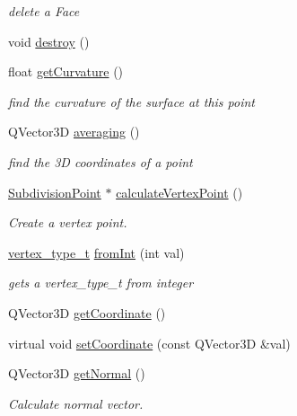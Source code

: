 \begin{DoxyCompactItemize}
\begin{DoxyCompactList}\small\item\em delete a Face \end{DoxyCompactList}\item 
void \hyperlink{classShipCAD_1_1SubdivisionPoint_a6037d6e3e78c9cc0d7909a4e55737ad6}{destroy} ()
\item 
float \hyperlink{classShipCAD_1_1SubdivisionPoint_aa07a859d70f97e57fc5318fc64a9d897}{get\-Curvature} ()
\begin{DoxyCompactList}\small\item\em find the curvature of the surface at this point \end{DoxyCompactList}\item 
Q\-Vector3\-D \hyperlink{classShipCAD_1_1SubdivisionPoint_a0c9e47af796dacd9542d065bbd0d0fcf}{averaging} ()
\begin{DoxyCompactList}\small\item\em find the 3\-D coordinates of a point \end{DoxyCompactList}\item 
\hyperlink{classShipCAD_1_1SubdivisionPoint}{Subdivision\-Point} $\ast$ \hyperlink{classShipCAD_1_1SubdivisionPoint_a92632ddbe28fb6901e445b60eab8d3ee}{calculate\-Vertex\-Point} ()
\begin{DoxyCompactList}\small\item\em Create a vertex point. \end{DoxyCompactList}\item 
\hyperlink{namespaceShipCAD_a03171cc921c53a568b778f5131a60deb}{vertex\-\_\-type\-\_\-t} \hyperlink{classShipCAD_1_1SubdivisionPoint_ad6ef4b07ee0d97756395c7bac4082f42}{from\-Int} (int val)
\begin{DoxyCompactList}\small\item\em gets a vertex\-\_\-type\-\_\-t from integer \end{DoxyCompactList}\item 
Q\-Vector3\-D \hyperlink{classShipCAD_1_1SubdivisionPoint_a0cf49d3e181eb00c08119721b33275bc}{get\-Coordinate} ()
\item 
virtual void \hyperlink{classShipCAD_1_1SubdivisionPoint_a98ab99a0ccc4709a40e05b36147c0f55}{set\-Coordinate} (const Q\-Vector3\-D \&val)
\item 
Q\-Vector3\-D \hyperlink{classShipCAD_1_1SubdivisionPoint_a8dd5facd4006480baea4a7f4487094f5}{get\-Normal} ()
\begin{DoxyCompactList}\small\item\em Calculate normal vector. \end{DoxyCompactList}\item 

\end{DoxyCompactItemize}

